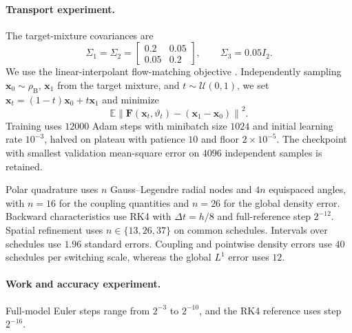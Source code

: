 \documentclass[twoside,11pt]{article}
\theoremstyle{plain}
\def\E{\mathbb E}
\newcommand{\bfF}{\mathbf{F}}
\newcommand{\bfx}{\mathbf{x}}
\begin{document}
\paragraph{Transport experiment.}
The target-mixture covariances are
\[
\Sigma_1=\Sigma_2=
\begin{bmatrix}
0.2&0.05\\
0.05&0.2
\end{bmatrix},
\qquad
\Sigma_3=0.05I_2.
\]
We use the linear-interpolant flow-matching objective \cite{lipman2023flow}.
Independently sampling $\bfx_0\sim\rho_{\mathrm B}$, $\bfx_1$ from the target
mixture, and $t\sim\mathcal U(0,1)$, we set $\bfx_t=(1-t)\bfx_0+t\bfx_1$ and minimize
\[
\E\left\|
\bfF(\bfx_t,\vartheta_t)-(\bfx_1-\bfx_0)
\right\|^2.
\]
Training uses $12000$ Adam steps with minibatch size $1024$ and initial learning
rate $10^{-3}$, halved on plateau with patience $10$ and floor
$2\times10^{-5}$. The checkpoint with smallest validation mean-square error on
$4096$ independent samples is retained.

Polar quadrature uses $n$ Gauss--Legendre radial nodes and $4n$ equispaced
angles, with $n=16$ for the coupling quantities and $n=26$ for the global
density error. Backward characteristics use RK4 with $\Delta t=h/8$ and
full-reference step $2^{-12}$. Spatial refinement uses
$n\in\{13,26,37\}$ on common schedules. Intervals over schedules use
$1.96$ standard errors. Coupling and pointwise density errors use $40$ schedules per switching scale,
whereas the global $L^1$ error uses $12$.

\paragraph{Work and accuracy experiment.}
Full-model Euler steps range from $2^{-3}$ to $2^{-10}$, and the RK4 reference
uses step $2^{-16}$.












 

\end{document}

